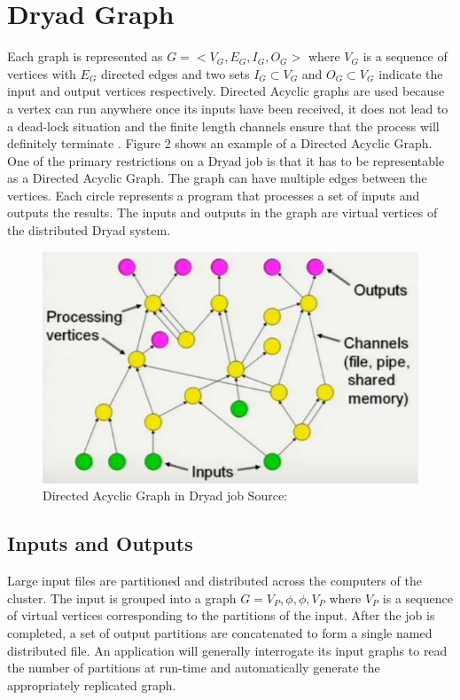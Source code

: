 \documentclass[9pt,twocolumn,twoside]{../../styles/osajnl}
\begin{document}
\section{Dryad Graph}
Each graph is represented as $G = <V_G, E_G, I_G, O_G>$ \cite{DryadMSR2} where $V_G$ is a   sequence of vertices with $E_G$ directed edges and two sets $I_G \subset V_G$ and  $O_G \subset V_G$ indicate the input and output vertices respectively. Directed Acyclic graphs are used because a vertex can run anywhere once its inputs have been received, it does not lead to a dead-lock situation and the finite length channels ensure that the process will definitely terminate \cite{www-DryadYT}. Figure 2 shows an example of a Directed Acyclic Graph. One of the primary restrictions on a Dryad job is that it has to be representable as a Directed Acyclic Graph. The graph can have multiple edges between the vertices. Each circle represents a program that processes a set of inputs and outputs the results. The inputs and outputs in the graph are virtual vertices of the distributed Dryad system. 
\begin{figure}[htbp]
\begin{center}
\centering
\includegraphics[width=\linewidth]{images/img2}
\caption{Directed Acyclic Graph in Dryad job Source:\cite{www-DryadYT}}
\label{fig:false-color}
\end{center}
\end{figure}
\subsection{Inputs and Outputs}
Large input files are partitioned and distributed
across the computers of the cluster. The input is grouped into a graph $G = V_P , \phi, \phi, V_P$ where $V_P$ \cite{DryadMSR3} is a sequence of virtual vertices corresponding to the partitions of the input. After the job is completed, a set of output partitions are concatenated to form a single named distributed file. An application will generally interrogate its input graphs to read the number of partitions at run-time and automatically generate the appropriately replicated graph.
\end{document}
